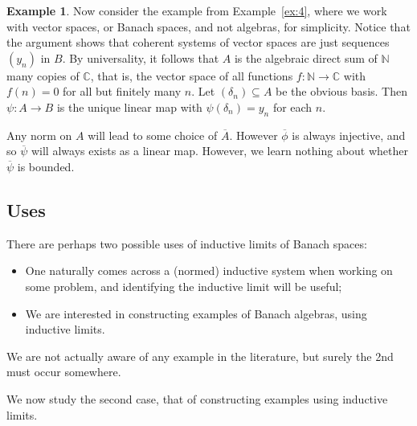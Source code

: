 \documentclass[a4paper,11pt]{article}
\theoremstyle{definition}
\newtheorem{example}[lemma]{Example}
\begin{document}
\begin{example}
Now consider the example from Example~\ref{ex:4}, where we work with vector spaces, or Banach
spaces, and not algebras, for simplicity.  Notice that the argument shows that coherent systems of
vector spaces are just sequences $(y_n)$ in $B$.  By universality, it follows that $A$ is the
algebraic direct sum of $\mathbb N$ many copies of $\mathbb C$, that is, the vector space of
all functions $f:\mathbb N\rightarrow\mathbb C$ with $f(n)=0$ for all but finitely many $n$.
Let $(\delta_n) \subseteq A$ be the obvious basis.  Then $\psi:A\rightarrow B$ is the unique linear
map with $\psi(\delta_n) = y_n$ for each $n$.

Any norm on $A$ will lead to some choice of $\overline A$.  However $\overline\phi$ is always
injective, and so $\overline\psi$ will always exists as a linear map.  However, we learn nothing
about whether $\overline\psi$ is bounded.
\end{example}



\subsection{Uses}

There are perhaps two possible uses of inductive limits of Banach spaces:
\begin{itemize}
\item One naturally comes across a (normed) inductive system when working on some problem,
and identifying the inductive limit will be useful;
\item We are interested in constructing examples of Banach algebras, using inductive limits.
\end{itemize}
We are not actually aware of any example in the literature, but surely the 2nd must occur somewhere.

We now study the second case, that of constructing examples using inductive limits.
\end{document}
